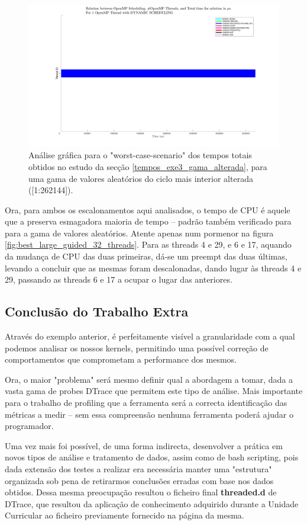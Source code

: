 \documentclass[a4paper]{article}
\begin{document}
\begin{figure}[H]
\centering
\includegraphics[width=0.9\columnwidth]{PNG/worst_large_dynamic_1_threads.png}
\caption{ Análise gráfica para o "worst-case-scenario" dos tempos totais obtidos no estudo da secção \ref{tempos_exe3_gama_alterada}, para uma gama de valores aleatórios do ciclo mais interior alterada  ([1:262144]).  }
\label{fig:worst_large_dynamic_1_threads}
\end{figure}

Ora, para ambos os escalonamentos aqui analisados, o tempo de CPU é aquele que a preserva esmagadora maioria de tempo -- padrão também verificado para para a gama de valores aleatórios. Atente apenas num pormenor na figura 
\ref{fig:best_large_guided_32_threads}. Para as threads 4 e 29, e 6 e 17, aquando da mudança de CPU das duas primeiras, dá-se um preempt das duas últimas, levando a concluir que as mesmas foram descalonadas, dando lugar às threads 4 e 29, passando as threads 6 e 17 a ocupar o lugar das anteriores.

\subsection{Conclusão do Trabalho Extra}

Através do exemplo anterior, é perfeitamente visível a granularidade com a qual podemos analisar os nossos kernels, permitindo uma possível correção de comportamentos que comprometam a performance dos mesmos. \par
Ora, o maior "problema" será mesmo definir qual a abordagem a tomar, dada a vasta gama de probes DTrace que permitem este tipo de análise. Mais importante para o trabalho de profiling que a ferramenta será a correcta identificação das métricas a medir -- sem essa compreensão nenhuma ferramenta poderá ajudar o programador.
\par 
Uma vez mais foi possível, de uma forma indirecta, desenvolver a prática em novos tipos de análise e tratamento de dados, assim como de bash scripting, pois dada extensão dos testes a realizar era necessária manter uma "estrutura" organizada sob pena de retirarmos conclusões erradas com base nos dados obtidos. Dessa mesma preocupação resultou o ficheiro final \textbf{threaded.d} de DTrace, que resultou da aplicação de conhecimento adquirido durante a Unidade Curricular ao ficheiro previamente fornecido na página da mesma.\par 
\end{document}
